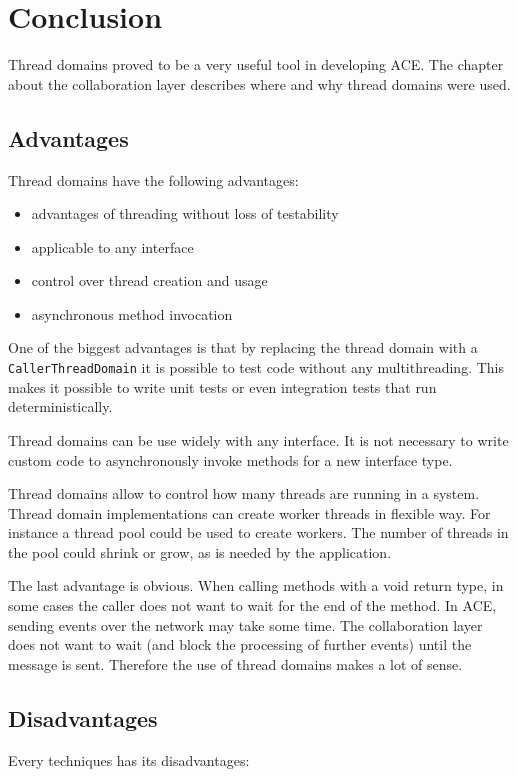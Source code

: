 \section{Conclusion}

Thread domains proved to be a very useful tool in developing ACE. The
chapter about the collaboration layer describes where and why thread
domains were used.


\subsection{Advantages}
Thread domains have the following advantages:

\begin{itemize}
 \item advantages of threading without loss of testability
 \item applicable to any interface
 \item control over thread creation and usage
 \item asynchronous method invocation
\end{itemize}

One of the biggest advantages is that by replacing the thread domain with
a \texttt{CallerThreadDomain} it is possible to test code without any
multithreading. This makes it possible to write unit tests or even 
integration tests that run deterministically.

Thread domains can be use widely with any interface. It is not necessary to
write custom code to asynchronously invoke methods for a new interface type.

Thread domains allow to control how many threads are running in a system.
Thread domain implementations can create worker threads in flexible way. For
instance a thread pool could be used to create workers. The number of
threads in the pool could shrink or grow, as is needed by the application.

The last advantage is obvious. When calling methods with a void return type,
in some cases the caller does not want to wait for the end of the method.
In ACE, sending events over the network may take some time. The collaboration
layer does not want to wait (and block the processing of further events)
until the message is sent. Therefore the use of thread domains makes a
lot of sense.


\subsection{Disadvantages}
Every techniques has its disadvantages:


